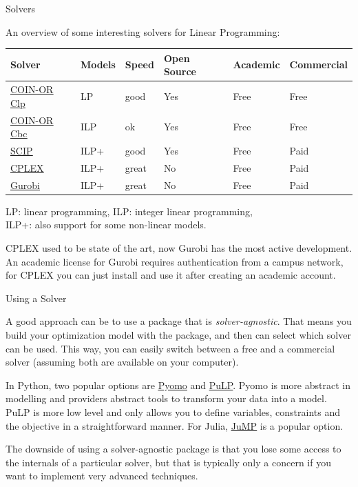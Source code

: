 \documentclass[10pt]{beamer}
\begin{document}
\begin{frame}[fragile]{Solvers}

An overview of some interesting solvers for Linear Programming:

\begin{table}
\begin{tabular}{llllll}
\toprule
Solver & Models & Speed & Open Source & Academic & Commercial \\
\midrule
\href{https://projects.coin-or.org/Clp}{\color{cyan}\underline{COIN-OR Clp}} & LP & good & Yes & Free & Free \\
\href{https://github.com/coin-or/Cbc}{\color{cyan}\underline{COIN-OR Cbc}} & ILP & ok & Yes & Free & Free \\
\href{https://www.scipopt.org/}{\color{cyan}\underline{SCIP}} & ILP+ & good & Yes & Free & Paid \\
\href{https://www.ibm.com/analytics/cplex-optimizer}{\color{cyan}\underline{CPLEX}} & ILP+ & great & No & Free & Paid \\
\href{https://www.gurobi.com/}{\color{cyan}\underline{Gurobi}} & ILP+ & great & No & Free & Paid \\
\bottomrule
\end{tabular}
\end{table}

LP: linear programming, ILP: integer linear programming, \\ ILP+: also support for some non-linear models.

{CPLEX used to be state of the art, now Gurobi has the most active development.
An academic license for Gurobi requires authentication from a campus network, for CPLEX you can just install and use it after
creating an academic account.}

\end{frame}

\begin{frame}[fragile]{Using a Solver}

A good approach can be to use a package that is \emph{solver-agnostic}. That means you build your optimization model with the package, and
then can select which solver can be used. This way, you can easily switch between a free and a commercial solver (assuming both are available on your computer).

In Python, two popular options are \href{https://www.pyomo.org/}{\color{cyan}\underline{Pyomo}} and \href{https://github.com/coin-or/pulp}{\color{cyan}\underline{PuLP}}.
Pyomo is more abstract in modelling and providers abstract tools to transform your data into a model. PuLP is more low level and only allows you to define variables, constraints
and the objective in a straightforward manner. For Julia, \href{https://jump.dev}{\color{cyan}\underline{JuMP}} is a popular option.

The downside of using a solver-agnostic package is that you lose some access to the internals of a particular solver, but that is typically only a concern if you want
to implement very advanced techniques.

\end{frame}
\end{document}
